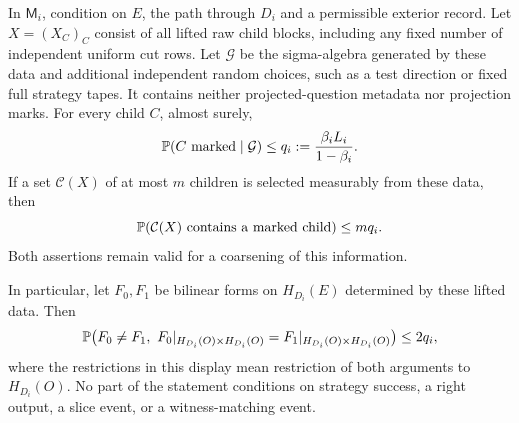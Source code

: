 \begin{lemma}\label{lem:posterior}
In $\mathsf M_i$, condition on $E$, the path through $D_i$ and a permissible
exterior record.  Let $X=(X_C)_C$ consist of all lifted raw child blocks,
including any fixed number of independent uniform cut rows.  Let
$\mathcal G$ be the sigma-algebra generated by these data and additional
independent random choices, such as a test direction or fixed full strategy
tapes.  It contains neither projected-question metadata nor projection marks.
For every child $C$, almost surely,
\begin{equation}\label{eq:posterior-bound}
 \mathbb P(C\text{ marked}\mid\mathcal G)
  \le q_i:=\frac{\beta_i L_i}{1-\beta_i}.
\end{equation}
If a set $\mathcal C(X)$ of at most $m$ children is selected measurably from
these data, then
\begin{equation}\label{eq:adaptive-child-bound}
 \mathbb P(\mathcal C(X)\text{ contains a marked child})\le m q_i.
\end{equation}
Both assertions remain valid for a coarsening of this information.

In particular, let $F_0,F_1$ be bilinear forms on $H_{D_i}(E)$ determined by
these lifted data.  Then
\begin{equation}\label{eq:adaptive-bilinear-error}
 \Prob\bigl(F_0\ne F_1,\ 
   F_0|_{H_{D_i}(O)\times H_{D_i}(O)}
       =F_1|_{H_{D_i}(O)\times H_{D_i}(O)}\bigr)
 \le 2q_i,
\end{equation}
where the restrictions in this display mean restriction of both arguments
to $H_{D_i}(O)$.
No part of the statement conditions on strategy success, a right output,
a slice event, or a witness-matching event.
\end{lemma}

